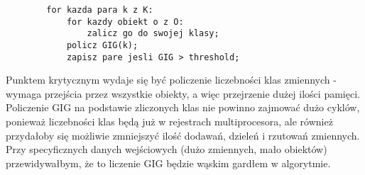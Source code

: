 \documentclass[a4paper]{article}
\begin{document}
    \begin{lstlisting}
        for kazda para k z K:
            for kazdy obiekt o z O:
                zalicz go do swojej klasy;
            policz GIG(k);
            zapisz pare jesli GIG > threshold;
    \end{lstlisting}

    Punktem krytycznym wydaje się być policzenie liczebności klas zmiennych - wymaga przejścia przez wszystkie obiekty, a więc przejrzenie dużej ilości pamięci. Policzenie GIG na podstawie zliczonych klas nie powinno zajmować dużo cyklów, ponieważ liczebności klas będą już w rejestrach multiprocesora, ale również przydałoby się możliwie zmniejszyć ilość dodawań, dzieleń i rzutowań zmiennych. Przy specyficznych danych wejściowych (dużo zmiennych, mało obiektów) przewidywałbym, że to liczenie GIG będzie wąskim gardłem w algorytmie.
\end{document}
